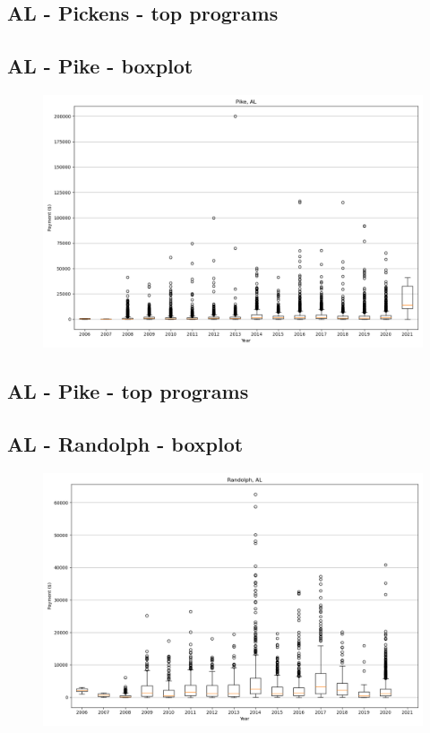 \subsection*{AL - Pickens - top programs}

\newpage
\subsection*{AL - Pike - boxplot}
\begin{figure}[h]
\centering
\includegraphics[width=7in]{../output/boxplots/counties/Pike-AL_boxplot.png}
\end{figure}


\subsection*{AL - Pike - top programs}

\newpage
\subsection*{AL - Randolph - boxplot}
\begin{figure}[h]
\centering
\includegraphics[width=7in]{../output/boxplots/counties/Randolph-AL_boxplot.png}
\end{figure}



